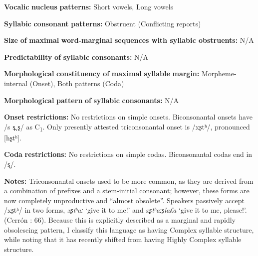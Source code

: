\begin{styleBody}
\textbf{Vocalic} \textbf{nucleus} \textbf{patterns:} Short vowels, Long vowels
\end{styleBody}

\begin{styleBody}
\textbf{Syllabic} \textbf{consonant} \textbf{patterns:} Obstruent (Conflicting reports)
\end{styleBody}

\begin{styleBody}
\textbf{Size} \textbf{of} \textbf{maximal} \textbf{word{}-marginal sequences with syllabic obstruents:} N/A
\end{styleBody}

\begin{styleBody}
\textbf{Predictability} \textbf{of} \textbf{syllabic} \textbf{consonants:} N/A
\end{styleBody}

\begin{styleBody}
\textbf{Morphological} \textbf{constituency} \textbf{of} \textbf{maximal} \textbf{syllable} \textbf{margin:} Morpheme-internal (Onset), Both patterns (Coda)
\end{styleBody}

\begin{styleBody}
\textbf{Morphological} \textbf{pattern} \textbf{of} \textbf{syllabic} \textbf{consonants:} N/A
\end{styleBody}

\begin{styleBody}
\textbf{Onset} \textbf{restrictions:} No restrictions on simple onsets. Biconsonantal onsets have /s s̪ ʂ/ as C\textsubscript{1}. Only presently attested triconsonantal onset is /xʂtʰ/, pronounced [hʂtʰ].
\end{styleBody}

\begin{styleBody}
\textbf{Coda} \textbf{restrictions:} No restrictions on simple codas. Biconsonantal codas end in /s̪/.
\end{styleBody}

\begin{styleBody}
\textbf{Notes:} Triconsonantal onsets used to be more common, as they are derived from a combination of prefixes and a stem-initial consonant; however, these forms are now completely unproductive and “almost obsolete”. Speakers passively accept /xʂtʰ/ in two forms, \textit{xʂtʰaː} ‘give it to me!’ and \textit{xʂtʰaːʂlaʎa} ‘give it to me, please!’. (Cerrón \citealt{Palomino2006}: 66). Because this is explicitly described as a marginal and rapidly obsolescing pattern, I classify this language as having Complex syllable structure, while noting that it has recently shifted from having Highly Complex syllable structure.
\end{styleBody}


